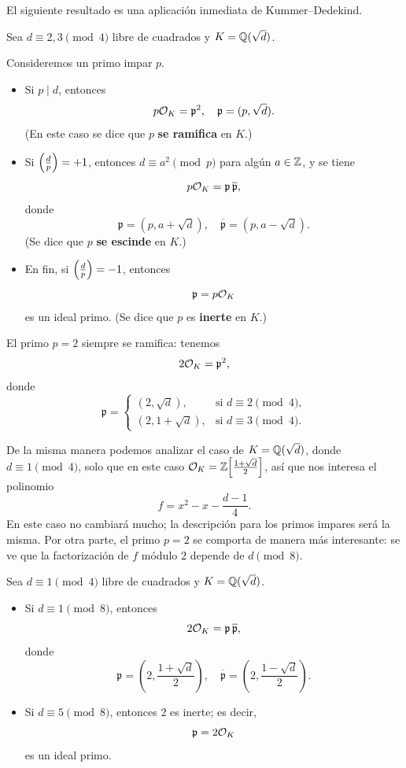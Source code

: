 El siguiente resultado es una aplicación inmediata de Kummer--Dedekind.

\begin{proposicion}
  Sea $d \equiv 2,3 \pmod{4}$ libre de cuadrados y $K = \mathbb{Q} (\sqrt{d})$.

  Consideremos un primo impar $p$.
  \begin{itemize}
  \item Si $p \mid d$, entonces
    $$p \mathcal{O}_K = \mathfrak{p}^2, \quad \mathfrak{p} = (p, \sqrt{d}).$$
    (En este caso se dice que $p$ \textbf{se ramifica} en $K$.)

  \item Si $\left(\frac{d}{p}\right) = +1$, entonces $d \equiv a^2 \pmod{p}$ para
    algún $a \in \mathbb{Z}$, y se tiene
    $$p \mathcal{O}_K = \mathfrak{p} \, \overline{\mathfrak{p}},$$
    donde
    \[ \mathfrak{p} = (p, a + \sqrt{d}), \quad
       \overline{\mathfrak{p}} = (p, a - \sqrt{d}). \]
    (Se dice que $p$ \textbf{se escinde} en $K$.)

  \item En fin, si $\left(\frac{d}{p}\right) = -1$, entonces
    $$\mathfrak{p} = p \mathcal{O}_K$$
    es un ideal primo. (Se dice que $p$ es \textbf{inerte} en $K$.)
  \end{itemize}

  El primo $p = 2$ siempre se ramifica: tenemos
  $$2 \mathcal{O}_K = \mathfrak{p}^2,$$
  donde
  \[ \mathfrak{p} = \begin{cases}
    (2, \sqrt{d}), & \text{si }d \equiv 2\pmod{4},\\
    (2, 1+\sqrt{d}), & \text{si }d \equiv 3\pmod{4}.
  \end{cases} \]
\end{proposicion}

De la misma manera podemos analizar el caso de $K = \mathbb{Q} (\sqrt{d})$,
donde $d \equiv 1 \pmod{4}$, solo que en este caso
$\mathcal{O}_K = \mathbb{Z} \Bigl[\frac{1+\sqrt{d}}{2}\Bigr]$, así que nos interesa
el polinomio
$$f = x^2 - x - \frac{d-1}{4}.$$
En este caso no cambiará mucho; la descripción para los primos impares será
la misma. Por otra parte, el primo $p = 2$ se comporta de manera más
interesante: se ve que la factorización de $f$ módulo $2$ depende de
$d \pmod {8}$.

\begin{proposicion}
  Sea $d \equiv 1 \pmod{4}$ libre de cuadrados y $K = \mathbb{Q} (\sqrt{d})$.

  \begin{itemize}
  \item Si $d \equiv 1 \pmod{8}$, entonces
    $$2 \mathcal{O}_K = \mathfrak{p}\,\overline{\mathfrak{p}},$$
    donde
    \[ \mathfrak{p} = \left(2, \frac{1 + \sqrt{d}}{2}\right), \quad
       \overline{\mathfrak{p}} = \left(2, \frac{1 - \sqrt{d}}{2}\right). \]

  \item Si $d \equiv 5 \pmod{8}$, entonces $2$ es inerte; es decir,
    $$\mathfrak{p} = 2\mathcal{O}_K$$
    es un ideal primo.
  \end{itemize}
\end{proposicion}


